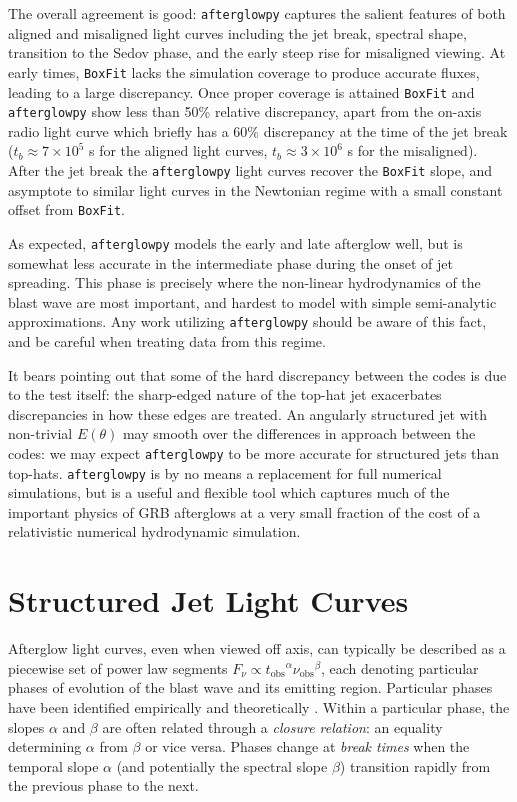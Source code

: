 \documentclass[twocolumn]{aastex62}
\newcommand{\afterglowpy}{{\tt afterglowpy}}
\newcommand{\boxfit}{{\tt BoxFit}}
\newcommand{\tobs}{\ensuremath{t_{\mathrm{obs}}}}
\newcommand{\nuobs}{\ensuremath{\nu_{\mathrm{obs}}}}
\begin{document}
The overall agreement is good: \afterglowpy{} captures the salient features of both aligned and misaligned light curves including the jet break, spectral shape, transition to the Sedov phase, and the early steep rise for misaligned viewing.  
At early times, \boxfit{} lacks the simulation coverage to produce accurate fluxes, leading to a large discrepancy.  Once proper coverage is attained \boxfit{} and \afterglowpy{} show less than 50\% relative discrepancy, apart from the on-axis radio light curve which briefly has a 60\% discrepancy at the time of the jet break ($t_b \approx 7 \times 10^5$ s for the aligned light curves, $t_b \approx 3\times 10^6$ s for the misaligned).  After the jet break the \afterglowpy{} light curves recover the \boxfit{} slope, and asymptote to similar light curves in the Newtonian regime with a small constant offset from \boxfit{}.

As expected, \afterglowpy{} models the early and late afterglow well, but is somewhat less accurate in the intermediate phase during the onset of jet spreading. This phase is precisely where the non-linear hydrodynamics of the blast wave are most important, and hardest to model with simple semi-analytic approximations.  Any work utilizing \afterglowpy{} should be aware of this fact, and be careful when treating data from this regime.

It bears pointing out that some of the hard discrepancy between the codes is due to the test itself: the sharp-edged nature of the top-hat jet exacerbates discrepancies in how these edges are treated.  An angularly structured jet with non-trivial $E(\theta)$ may smooth over the differences in approach between the codes: we may expect \afterglowpy{} to be more accurate for structured jets than top-hats.  \afterglowpy{} is by no means a replacement for full numerical simulations, but is a useful and flexible tool which captures much of the important physics of GRB afterglows at a very small fraction of the cost of a relativistic numerical hydrodynamic simulation.

%
%

\section{Structured Jet Light Curves}\label{sec:structuredJets}

Afterglow light curves, even when viewed off axis, can typically be described as a piecewise set of power law segments $F_\nu \propto \tobs^\alpha \nuobs^\beta$, each denoting particular phases of evolution of the blast wave and its emitting region.  Particular phases have been identified empirically \citep{Nousek:2006aa} and theoretically \citep{Zhang:2006aa}.   Within a particular phase, the slopes $\alpha$ and $\beta$ are often related through a \emph{closure relation}: an equality determining $\alpha$ from $\beta$ or vice versa.  Phases change at \emph{break times} when the temporal slope $\alpha$ (and potentially the spectral slope $\beta$) transition rapidly from the previous phase to the next.
\end{document}
